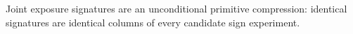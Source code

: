 Joint exposure signatures are an unconditional primitive compression: identical signatures are identical columns of every candidate sign experiment.